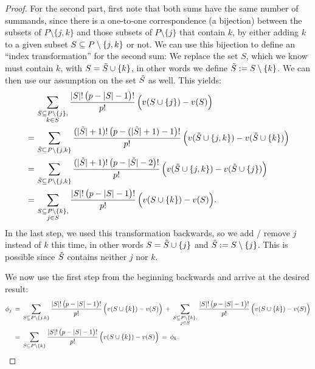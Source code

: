 {\begin{enumerate}
\begin{proof}
        For the second part, first note that both sums have the same number of summands, since there is a one-to-one correspondence (a bijection) between the subsets of $P \setminus \{j, k\}$ and those subsets of $P \setminus \{j\}$ that contain $k$, by either adding $k$ to a given subset $S \subseteq P \setminus \{j,k\}$ or not.
        We can use this bijection to define an ``index transformation'' for the second sum: We replace the set $S$, which we know must contain $k$, with $S = \Tilde{S} \cup \{k\}$, in other words we define $\Tilde{S} := S \setminus \{k\}$.
        We can then use our assumption on the set $\Tilde{S}$ as well.
        This yields:
        \begin{align*}
            & \sum_{\substack{S \subseteq P \setminus \{j\}, \\ k \in S}} \frac{|S|!\,\bigl(p - |S| - 1\bigr)!}{p!} \, \Bigl( v(S \cup \{j\}) - v(S) \Bigr)  \\
            \,=\, & \sum_{\Tilde{S} \subseteq P \setminus \{j, k\}} \frac{(|\Tilde{S}| + 1)!\,\bigl(p - (|\Tilde{S}| + 1) - 1\bigr)!}{p!} \, \Bigl( v(\Tilde{S} \cup \{j, k\}) - v(\Tilde{S} \cup \{k\}) \Bigr) \\
            \,=\, & \sum_{\Tilde{S} \subseteq P \setminus \{j, k\}} \frac{(|\Tilde{S}| + 1)!\,\bigl(p - |\Tilde{S}| - 2\bigr)!}{p!} \, \Bigl( v(\Tilde{S} \cup \{j, k\}) - v(\Tilde{S} \cup \{j\}) \Bigr) \\
            \,=\, & \sum_{\substack{S \subseteq P \setminus \{k\}, \\ j \in S}} \frac{|S|!\,\bigl(p - |S| - 1\bigr)!}{p!} \, \Bigl( v(S \cup \{k\}) - v(S) \Bigr).
        \end{align*}
        In the last step, we used this transformation backwards, so we add / remove $j$ instead of $k$ this time, in other words $S = \Tilde{S} \cup \{j\}$ and $\Tilde{S} := S \setminus \{j\}$. This is possible since $\Tilde{S}$ contains neither $j$ nor $k$.
        
        We now use the first step from the beginning backwards and arrive at the desired result:
        \begin{align*}
            \phi_j
            & \,=\, \sum_{S \subseteq P \setminus \{j, k\}} \frac{|S|!\,\bigl(p - |S| - 1\bigr)!}{p!} \, \Bigl( v(S \cup \{k\}) - v(S) \Bigr) 
            \,+\, \sum_{\substack{S \subseteq P \setminus \{k\}, \\ j \in S}} \frac{|S|!\,\bigl(p - |S| - 1\bigr)!}{p!} \, \Bigl( v(S \cup \{k\}) - v(S) \Bigr) \\
            & \,=\, \sum_{S \subseteq P \setminus \{k\}} \frac{|S|!\,\bigl(p - |S| - 1\bigr)!}{p!} \, \Bigl( v(S \cup \{k\}) - v(S) \Bigr) 
            \,=\, \phi_k.
        \end{align*}
        

\end{proof}
\end{enumerate}}
